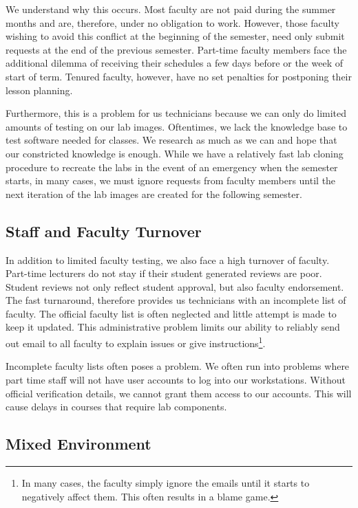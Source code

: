 We understand why this occurs.  Most faculty are not paid during the summer months and are, therefore, under no obligation to work.  However, those faculty wishing to avoid this conflict at the beginning of the semester, need only submit requests at the end of the previous semester.  Part-time faculty members face the additional dilemma of receiving their schedules a few days before or the week of start of term.  Tenured faculty, however, have no set penalties for postponing their lesson planning.  

Furthermore, this is a problem for us technicians because we can only do limited amounts of testing on our lab images.  Oftentimes, we lack the knowledge base to test software needed for classes.  We research as much as we can and hope that our constricted knowledge is enough.  While we have a relatively fast lab cloning procedure to recreate the labs in the event of an emergency when the semester starts, in many cases, we must ignore requests from faculty members until the next iteration of the lab images are created for the following semester. 

\subsection{Staff and Faculty Turnover}
In addition to limited faculty testing, we also face a high turnover of faculty.  Part-time lecturers do not stay if their student generated reviews are poor.  Student reviews not only reflect student approval, but also faculty endorsement.  The fast  turnaround, therefore provides us technicians with an incomplete list of faculty.  The official faculty list is often neglected and little attempt is made to keep it updated. This administrative problem limits our ability to reliably send out email to all faculty to explain issues or give instructions\footnote{In many cases, the faculty simply ignore the emails until it starts to negatively affect them. This often results in a blame game.}.

Incomplete faculty lists often poses a problem.  We often run into problems where part time staff will not have user accounts to log into our workstations.  Without official verification details, we cannot grant them access to our accounts.  This will cause delays in courses that require lab components. 

\subsection{Mixed Environment}

